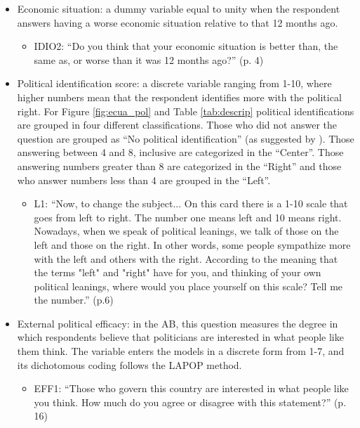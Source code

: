 \documentclass[12pt,a4]{article}\usepackage[]{graphicx}\usepackage[]{xcolor}
\begin{document}
\begin{itemize}
\item Economic situation: a dummy variable equal to unity when the respondent answers having a worse economic situation relative to that 12 months ago. 
  \begin{itemize}
    \item IDIO2: \enquote{Do you think that your economic situation is better than, the same
as, or worse than it was 12 months ago?} (p. 4)
  \end{itemize}  

  \item Political identification score: a discrete variable ranging from 1-10, where higher numbers mean that the respondent identifies more with the political right. For Figure \ref{fig:ecua_pol} and Table \ref{tab:descrip} political identifications are grouped in four different classifications. Those who did not answer the question are grouped as \enquote{No political identification} (as suggested by \textcite{Moncagatta.2020}). Those answering between 4 and 8, inclusive are categorized in the \enquote{Center}. Those answering numbers greater than 8 are categorized in the \enquote{Right} and those who answer numbers less than 4 are grouped in the \enquote{Left}. 
  \begin{itemize}
    \item L1: \enquote{Now, to change the subject... On this card there is a 1-10 scale
that goes from left to right. The number one means left and 10
means right. Nowadays, when we speak of political leanings, we
talk of those on the left and those on the right. In other words,
some people sympathize more with the left and others with the
right. According to the meaning that the terms "left" and "right"
have for you, and thinking of your own political leanings, where
would you place yourself on this scale? Tell me the number.} (p.6)
  \end{itemize}

\item External political efficacy: in the AB, this question measures the degree in which respondents believe that politicians are interested in what people like them think. The variable enters the models in a discrete form from 1-7, and its dichotomous coding follows the LAPOP method. 
  \begin{itemize}
    \item EFF1: \enquote{Those who govern this country are interested in what people like
you think. How much do you agree or disagree with this statement?} (p. 16)
  \end{itemize}  
  

\end{itemize}
\end{document}
